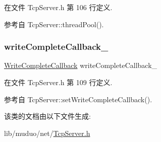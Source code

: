 在文件 Tcp\+Server.\+h 第 106 行定义.



参考自 Tcp\+Server\+::thread\+Pool().

\mbox{\label{classmuduo_1_1net_1_1TcpServer_a525f0d11cfa2e271600caa30407b6150}} 
\subsubsection{\texorpdfstring{write\+Complete\+Callback\+\_\+}{writeCompleteCallback\_}}
{\footnotesize\ttfamily \hyperlink{namespacemuduo_1_1net_a525c3730bfefb763975b035ebc88a63d}{Write\+Complete\+Callback} write\+Complete\+Callback\+\_\+\hspace{0.3cm}{\ttfamily [private]}}



在文件 Tcp\+Server.\+h 第 109 行定义.



参考自 Tcp\+Server\+::set\+Write\+Complete\+Callback().



该类的文档由以下文件生成\+:\begin{DoxyCompactItemize}
\item 
lib/muduo/net/\hyperlink{muduo_2net_2TcpServer_8h}{Tcp\+Server.\+h}\end{DoxyCompactItemize}
